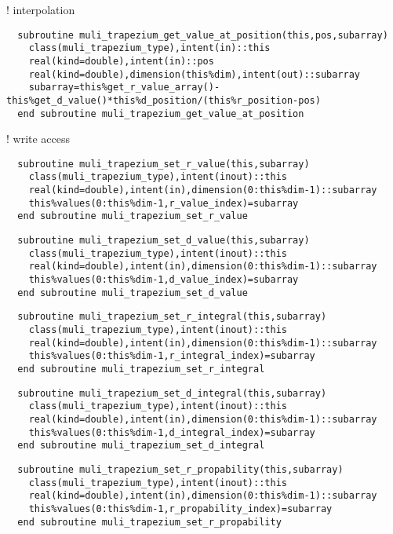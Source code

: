   ! interpolation
  
\begin{Verbatim}
  subroutine muli_trapezium_get_value_at_position(this,pos,subarray)
    class(muli_trapezium_type),intent(in)::this
    real(kind=double),intent(in)::pos
    real(kind=double),dimension(this%dim),intent(out)::subarray
    subarray=this%get_r_value_array()-this%get_d_value()*this%d_position/(this%r_position-pos)
  end subroutine muli_trapezium_get_value_at_position
\end{Verbatim}

  ! write access

\begin{Verbatim}
  subroutine muli_trapezium_set_r_value(this,subarray)
    class(muli_trapezium_type),intent(inout)::this
    real(kind=double),intent(in),dimension(0:this%dim-1)::subarray
    this%values(0:this%dim-1,r_value_index)=subarray
  end subroutine muli_trapezium_set_r_value
\end{Verbatim}

\begin{Verbatim}
  subroutine muli_trapezium_set_d_value(this,subarray)
    class(muli_trapezium_type),intent(inout)::this
    real(kind=double),intent(in),dimension(0:this%dim-1)::subarray
    this%values(0:this%dim-1,d_value_index)=subarray
  end subroutine muli_trapezium_set_d_value
\end{Verbatim}

\begin{Verbatim}
  subroutine muli_trapezium_set_r_integral(this,subarray)
    class(muli_trapezium_type),intent(inout)::this
    real(kind=double),intent(in),dimension(0:this%dim-1)::subarray
    this%values(0:this%dim-1,r_integral_index)=subarray
  end subroutine muli_trapezium_set_r_integral
\end{Verbatim}

\begin{Verbatim}
  subroutine muli_trapezium_set_d_integral(this,subarray)
    class(muli_trapezium_type),intent(inout)::this
    real(kind=double),intent(in),dimension(0:this%dim-1)::subarray
    this%values(0:this%dim-1,d_integral_index)=subarray
  end subroutine muli_trapezium_set_d_integral
\end{Verbatim}

\begin{Verbatim}
  subroutine muli_trapezium_set_r_propability(this,subarray)
    class(muli_trapezium_type),intent(inout)::this
    real(kind=double),intent(in),dimension(0:this%dim-1)::subarray
    this%values(0:this%dim-1,r_propability_index)=subarray
  end subroutine muli_trapezium_set_r_propability
\end{Verbatim}

